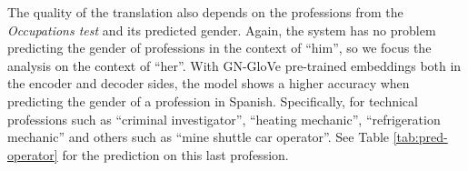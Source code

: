 \documentclass[11pt,a4paper]{article}
\begin{document}
The quality of the translation also depends on the professions from the \textit{Occupations test} and its predicted gender.
Again, the system has no problem predicting the gender of professions in the context of ``him'', so we focus the analysis on the context of ``her''.
With GN-GloVe pre-trained embeddings both in the encoder and decoder sides, the model shows a higher accuracy when predicting the gender of a profession in Spanish. 
Specifically, for technical professions such as ``criminal investigator'', ``heating mechanic'', ``refrigeration mechanic'' and others such as ``mine shuttle car operator''.
See Table \ref{tab:pred-operator} for the prediction on this last profession.

\end{document}
